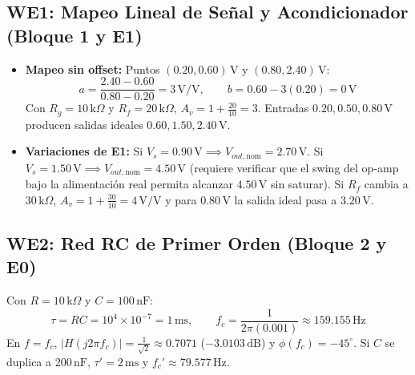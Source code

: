 \documentclass[11pt, a4paper]{article}
\begin{document}
\subsection*{WE1: Mapeo Lineal de Señal y Acondicionador (Bloque 1 y E1)}
\begin{itemize}[noitemsep]
    \item \textbf{Mapeo sin offset:} Puntos $(0.20, 0.60)\,\text{V}$ y $(0.80, 2.40)\,\text{V}$:
    \[
        a = \frac{2.40 - 0.60}{0.80 - 0.20} = 3\,\text{V/V}, \qquad b = 0.60 - 3(0.20) = 0\,\text{V}
    \]
    Con $R_g = 10\,\text{k}\Omega$ y $R_f = 20\,\text{k}\Omega$, $A_v = 1 + \frac{20}{10} = 3$. Entradas $0.20, 0.50, 0.80\,\text{V}$ producen salidas ideales $0.60, 1.50, 2.40\,\text{V}$.
    \item \textbf{Variaciones de E1:} Si $V_s = 0.90\,\text{V} \implies V_{out,\text{nom}} = 2.70\,\text{V}$. Si $V_s = 1.50\,\text{V} \implies V_{out,\text{nom}} = 4.50\,\text{V}$ (requiere verificar que el swing del op-amp bajo la alimentación real permita alcanzar $4.50\,\text{V}$ sin saturar). Si $R_f$ cambia a $30\,\text{k}\Omega$, $A_v = 1 + \frac{30}{10} = 4\,\text{V/V}$ y para $0.80\,\text{V}$ la salida ideal pasa a $3.20\,\text{V}$.
\end{itemize}

\subsection*{WE2: Red RC de Primer Orden (Bloque 2 y E0)}
Con $R = 10\,\text{k}\Omega$ y $C = 100\,\text{nF}$:
\[
    \tau = RC = 10^4 \times 10^{-7} = 1\,\text{ms}, \qquad f_c = \frac{1}{2\pi(0.001)} \approx 159.155\,\text{Hz}
\]
En $f = f_c$, $|H(j2\pi f_c)| = \frac{1}{\sqrt{2}} \approx 0.7071$ ($-3.0103\,\text{dB}$) y $\phi(f_c) = -45^\circ$. Si $C$ se duplica a $200\,\text{nF}$, $\tau' = 2\,\text{ms}$ y $f_c' \approx 79.577\,\text{Hz}$.
\end{document}
